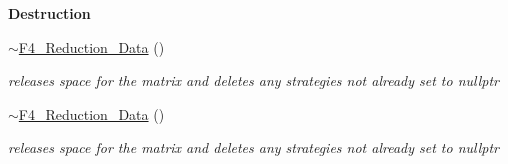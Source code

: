 \begin{Indent}\textbf{ Destruction}\par
\begin{DoxyCompactItemize}
\item 
\mbox{\label{group___g_b_computation_a6806b4da4f0bc2753ba5a775794f9165}} 
\hyperlink{group___g_b_computation_a6806b4da4f0bc2753ba5a775794f9165}{$\sim$\+F4\+\_\+\+Reduction\+\_\+\+Data} ()
\begin{DoxyCompactList}\small\item\em releases space for the matrix and deletes any strategies not already set to {\ttfamily nullptr} \end{DoxyCompactList}\item 
\mbox{\label{group___g_b_computation_a6806b4da4f0bc2753ba5a775794f9165}} 
\hyperlink{group___g_b_computation_a6806b4da4f0bc2753ba5a775794f9165}{$\sim$\+F4\+\_\+\+Reduction\+\_\+\+Data} ()
\begin{DoxyCompactList}\small\item\em releases space for the matrix and deletes any strategies not already set to {\ttfamily nullptr} \end{DoxyCompactList}\end{DoxyCompactItemize}
\end{Indent}
